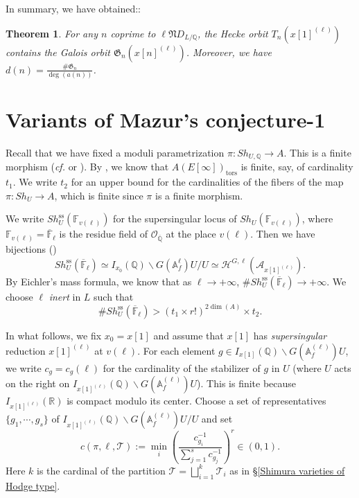 \documentclass[11pt,oneside,reqno]{amsart}
\newcommand{\ssrm}{\mathrm{ss}}
\newcommand{\A}{\mathbb{A}}
\newcommand{\F}{\mathbb{F}}
\newcommand{\Q}{\mathbb{Q}}
\newcommand{\R}{\mathbb{R}}
\newcommand{\Acal}{\mathcal{A}}
\newcommand{\Hcal}{\mathcal{H}}
\newcommand{\Ocal}{\mathcal{O}}
\newcommand{\Tcal}{\mathcal{T}}
\newcommand{\Gfrak}{\mathfrak{G}}
\newcommand{\Nfrak}{\mathfrak{N}}
\theoremstyle{plain}
\newtheorem{theorem}{Theorem}[section]
\begin{document}
	
	
	
	
	In summary, we have obtained::
	\begin{theorem}\label{theorem on Hecke orbit vs Galois orbit}
		For any $n$ coprime to $\ell\Nfrak D_{L/\Q}$, the Hecke orbit $T_n(x[1]^{(\ell)})$ contains the Galois orbit $\Gfrak_n(x[n]^{(\ell)})$. Moreover, we have $d(n)=\frac{\#\Gfrak_n}{\deg(a(n))}$.
	\end{theorem}
	
	
	
	
	
	\section{Variants of Mazur's conjecture-1}\label{Mazur's conjecture-1}
	Recall that we have fixed a moduli parametrization $\pi\colon Sh_{U,\Q}\to A$. This is a finite morphism (\emph{cf.} \cite[Theorem 3.9]{CornutVatsal2007} or \cite[§9]{Zhang2025}). By \cite[Lemma 4.1]{Cornut2002}, we know that $A(E[\infty])_\mathrm{tors}$ is finite, say, of cardinality $t_1$. We write $t_2$ for an upper bound for the cardinalities of the fibers of the map $\pi\colon Sh_{U}\to A$, which is finite since $\pi$ is a finite morphism.
	
	
	
	
	We write $Sh_{U}^\ssrm(\F_{v(\ell)})$ for the supersingular locus of $Sh_{U}(\F_{v(\ell)})$, where $\F_{v(\ell)}=\overline{\F}_\ell$ is the residue field of $\Ocal_{\overline{\Q}}$ at the place $v(\ell)$. Then we have bijections (\cite[Corollary 3.13 \& §3.2.5]{CornutVatsal2005})
	\[
	Sh_{U}^\ssrm(\overline{\F}_\ell)
	\simeq
	I_{x_0}(\Q)\backslash G(\A_f^{\ell})U/U
	\simeq
	\Hcal^{G,\ell}(\Acal_{x[1]^{(\ell)}}).
	\]
	By Eichler's mass formula, we know that as $\ell\to +\infty$, $\#Sh_{U}^\ssrm(\overline{\F}_\ell)\to +\infty$. We choose $\ell$ \emph{inert} in $L$ such that
	\begin{equation}\label{cardinal of Sh_U^ss}
		\#Sh_U^\ssrm(\overline{\F}_\ell)>(t_1\times r!)^{2\dim(A)}\times t_2.
	\end{equation}
	
	
	
	
	
	
	
	
	
	In what follows, we fix $x_0=x[1]$ and assume that $x[1]$ has \emph{supersingular} reduction $x[1]^{(\ell)}$ at $v(\ell)$. For each element $g\in I_{x[1]}(\Q)\backslash G(\A_f^{(\ell)})U$, we write $c_g=c_g(\ell)$ for the cardinality of the stabilizer of $g$ in $U$ (where $U$ acts on the right on $I_{x[1]^{(\ell)}}(\Q)\backslash G(\A_f^{(\ell)})U$). This is finite because $I_{x[1]^{(\ell)}}(\R)$ is compact modulo its center. Choose a set of representatives $\{g_1,\cdots,g_s\}$ of $I_{x[1]^{(\ell)}}(\Q)\backslash G(\A_f^{(\ell)})U/U$ and set
	\begin{equation}\label{c(pi,ell,T)}
		c(\pi,\ell,\Tcal):=\min_i
		\left(\frac{c_{g_i}^{-1}}{\sum_{j=1}^sc_{g_j}^{-1}}\right)^r
		\in(0,1).
	\end{equation}
	Here $k$ is the cardinal of the partition $\Tcal=\bigsqcup_{i=1}^k\Tcal_i$ as in §\ref{Shimura varieties of Hodge type}.
	
\end{document}
